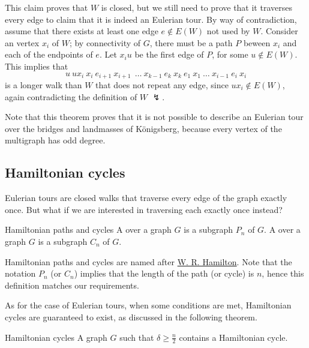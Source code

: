 \documentclass[a4paper, 12pt]{report}
\begin{document}
{        This claim proves that $W$ is closed, but we still need to prove that it traverses every edge to claim that it is indeed an Eulerian tour. By way of contradiction, assume that there exists at least one edge $e \notin E(W)$ not used by $W$. Consider an vertex $x_i$ of $W$; by connectivity of $G$, there must be a path $P$ beween $x_i$ and each of the endpoints of $e$. Let $x_i u$ be the first edge of $P$, for some $u \notin E(W)$. This implies that $$u \ ux_i \ x_i \ e_{i + 1} \ x_{ i+ 1} \ \ \ldots \ x_{k - 1} \ e_k \ x_k \ e_1 \ x_1 \ \ldots \ x_{i - 1} \ e_i \ x_i$$ is a longer walk than $W$ that does not repeat any edge, since $ux_i \notin E(W)$, again contradicting the definition of $W$ $\lightning$.
    }

    Note that this theorem proves that it is not possible to describe an Eulerian tour over the bridges and landmasses of Königsberg, because every vertex of the multigraph has odd degree.

    \subsection{Hamiltonian cycles}
    
    Eulerian tours are closed walks that traverse every edge of the graph exactly once. But what if we are interested in traversing each  exactly once instead?

    \begin{frameddefn}{Hamiltonian paths and cycles}
        A  over a graph $G$ is a subgraph $P_n$ of $G$. A  over a graph $G$ is a subgraph $C_n$ of $G$.
    \end{frameddefn}

    Hamiltonian paths and cycles are named after \href{https://en.wikipedia.org/wiki/William_Rowan_Hamilton}{W. R. Hamilton}. Note that the notation $P_n$ (or $C_n$) implies that the length of the path (or cycle) is $n$, hence this definition matches our requirements.

    As for the case of Eulerian tours, when some conditions are met, Hamiltonian cycles are guaranteed to exist, as discussed in the following theorem.

    \begin{framedthm}{Hamiltonian cycles}
        A graph $G$ such that $\delta \ge \tfrac{n}{2}$ contains a Hamiltonian cycle.
    \end{framedthm}
\end{document}
